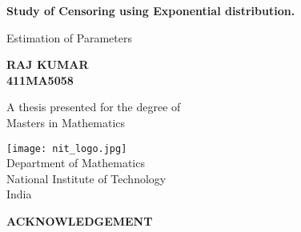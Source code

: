 \documentclass[12pt]{report}
\begin{document}
\begin{titlepage}
	\begin{center}
		\vspace*{1cm}
		
		\Huge
		\textbf{Study of Censoring using Exponential distribution.}
		
		\vspace{0.5cm}
		\LARGE
		Estimation of Parameters
		
		\vspace{1.5cm}
		
		\textbf{RAJ KUMAR \\411MA5058}
		
		\vfill
		
		A thesis presented for the degree of\\
		Masters in Mathematics
		
		\vspace{0.8cm}
		
		\texttt{[image: nit\_logo.jpg]}\\		
		\Large
		Department of Mathematics\\
		National Institute of Technology\\
		India\\	
	\end{center}
\end{titlepage}
\newpage
    \begin{center}
    	\textbf{\huge ACKNOWLEDGEMENT}
    \end{center}
    
\end{document}
